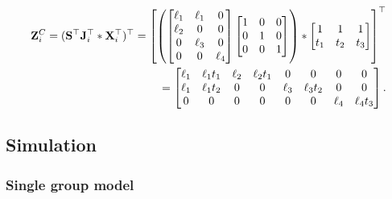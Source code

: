 \documentclass[12pt]{article}
\begin{document}
\begin{equation}
\begin{aligned}
{\mathbf Z}^{C}_{i} = ({\mathbf S}^{\top}{\mathbf J}^{\top}_{i} \ast {\mathbf X}^{\top}_{i})^{\top} =
\left[
\left(
\begin{bmatrix}
\ell_{1} & \ell_{1}  & 0 \\
\ell_{2} &  0  & 0 \\
0  &  \ell_{3} & 0 \\
0 & 0 &  \ell_{4} 
\end{bmatrix}
\begin{bmatrix}
1 & 0  & 0 \\
0 & 1  & 0 \\
0 & 0  & 1  
\end{bmatrix}
\right)
\ast
\begin{bmatrix}
1   & 1   & 1  \\ 
t_1 & t_2 & t_3
\end{bmatrix} 
\right]^{\top}
\\
= \begin{bmatrix}
\ell_{1} & \ell_{1}t_1 & \ell_{2} & \ell_{2}t_1 & 0 & 0 & 0 & 0 \\
\ell_{1} & \ell_{1}t_2 & 0 & 0 & \ell_{3} & \ell_{3}t_2 & 0 & 0 \\
0 & 0 & 0 & 0 & 0 & 0 & \ell_{4} & \ell_{4}t_3
\end{bmatrix}.
\end{aligned}
\label{eq:zmatrix}
\end{equation}

\subsection*{Simulation}
\subsubsection*{Single group model}
\end{document}
